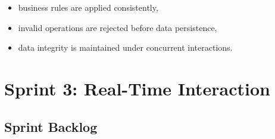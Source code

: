 \begin{itemize}
    \item business rules are applied consistently,
    \item invalid operations are rejected before data persistence,
    \item data integrity is maintained under concurrent interactions.
\end{itemize}
\clearpage
\section{Sprint 3: Real-Time Interaction}

\subsection{Sprint Backlog}


